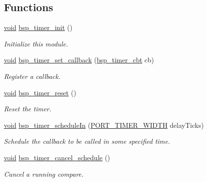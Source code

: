 \subsection*{Functions}
\begin{DoxyCompactItemize}
\item 
\hyperlink{usb__devapi_8h_afabf60e7f57651d6d595a02c75f07cd0}{void} \hyperlink{group__bsp__timer_gaffec2bf6372cf491a97821c19abad0fa}{bsp\+\_\+timer\+\_\+init} ()
\begin{DoxyCompactList}\small\item\em Initialize this module. \end{DoxyCompactList}\item 
\hyperlink{usb__devapi_8h_afabf60e7f57651d6d595a02c75f07cd0}{void} \hyperlink{group__bsp__timer_ga3a31a787657dccde5a1895fc87578589}{bsp\+\_\+timer\+\_\+set\+\_\+callback} (\hyperlink{openwsnmodule__obj_8h_a217f88f41d2d57897598ce4147c80419}{bsp\+\_\+timer\+\_\+cbt} cb)
\begin{DoxyCompactList}\small\item\em Register a callback. \end{DoxyCompactList}\item 
\hyperlink{usb__devapi_8h_afabf60e7f57651d6d595a02c75f07cd0}{void} \hyperlink{group__bsp__timer_ga797994251b8540f4be7628411cb98c73}{bsp\+\_\+timer\+\_\+reset} ()
\begin{DoxyCompactList}\small\item\em Reset the timer. \end{DoxyCompactList}\item 
\hyperlink{usb__devapi_8h_afabf60e7f57651d6d595a02c75f07cd0}{void} \hyperlink{group__bsp__timer_gac6b96b1c74c2fd8a4c307831d0fc7528}{bsp\+\_\+timer\+\_\+schedule\+In} (\hyperlink{z1_2board__info_8h_abe66b9c1c60db84f2a99f2b827275f24}{P\+O\+R\+T\+\_\+\+T\+I\+M\+E\+R\+\_\+\+W\+I\+D\+TH} delay\+Ticks)
\begin{DoxyCompactList}\small\item\em Schedule the callback to be called in some specified time. \end{DoxyCompactList}\item 
\hyperlink{usb__devapi_8h_afabf60e7f57651d6d595a02c75f07cd0}{void} \hyperlink{group__bsp__timer_ga46f9e9c7fb4f454fdc1febf216409ed6}{bsp\+\_\+timer\+\_\+cancel\+\_\+schedule} ()
\begin{DoxyCompactList}\small\item\em Cancel a running compare. \end{DoxyCompactList}\item 

\end{DoxyCompactItemize}
